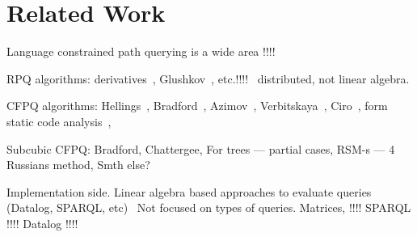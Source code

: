 \section{Related Work}

Language constrained path querying is a wide area !!!!

RPQ algorithms: derivatives~\cite{!!!}, Glushkov~\cite{!!!}, etc.!!!!~\cite{!!!} distributed, not linear algebra.

CFPQ algorithms: Hellings~\cite{!!!}, Bradford~\cite{8249039}, Azimov~\cite{!!!}, Verbitskaya~\cite{!!!}, Ciro~\cite{!!!}, form static code analysis~\cite{!!!}, 

Subcubic CFPQ: Bradford, Chattergee, For trees --- partial cases, RSM-s --- 4 Russians method, Smth else? 


Implementation side. 
Linear algebra based approaches to evaluate queries (Datalog, SPARQL, etc)~\cite{!!!} Not focused on types of queries.
Matrices, !!!!
SPARQL !!!!
Datalog !!!!